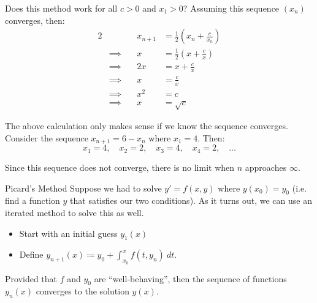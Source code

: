 Does this method work for all $c > 0$ and $x_1 > 0$? Assuming this sequence $(x_n)$ converges, then:
\begin{alignat*}{2}
    && x_{n+1} &= \frac{1}{2} \left( x_n + \frac{c}{x_n} \right) \\
    &\implies \quad &x &= \frac{1}{2} \left( x + \frac{c}{x} \right) \\
    &\implies &2x &= x + \frac{c}{x} \\
    &\implies &x &= \frac{c}{x} \\
    &\implies &x^2 &= c \\
    &\implies &x &= \sqrt{c}
\end{alignat*}

The above calculation only makes sense if we know the sequence converges. Consider the sequence $x_{n+1} = 6 - x_n$ where $x_1 = 4$. Then:
\[ x_1 = 4,\quad x_2 = 2,\quad x_3 = 4,\quad x_4 = 2,\quad \ldots \]


Since this sequence does not converge, there is no limit when $n$ approaches $\infty$.


\begin{exbox}{Picard's Method}{}
    Suppose we had to solve $y\prime = f(x,y)$ where $y(x_0) = y_0$ (i.e. find a function $y$ that satisfies our two conditions). As it turns out, we can use an iterated method to solve this as well.
    \begin{itemize}
        \item Start with an initial guess $y_1(x)$
        \item Define $\displaystyle y_{n+1}(x) \coloneq y_0 + \int_{x_0}^{x} f(t, y_n)\ dt$.
    \end{itemize}
    Provided that $f$ and $y_0$ are ``well-behaving'', then the sequence of functions $y_n(x)$ converges to the solution $y(x)$.
\end{exbox}

